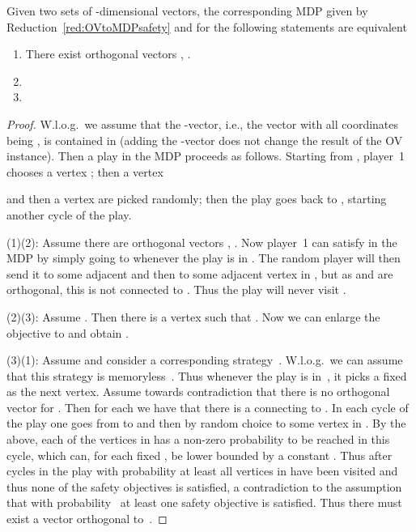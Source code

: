 \documentclass[11pt,letterpaper]{article}
\newif\iffullversion
\newcommand{\infull}[1]{\iffullversion #1\fi}
\begin{document}
\begin{lemma}\label{lem:OVtoMDPsafety}
  Given two sets  of -dimensional vectors,
  the corresponding MDP  given by Reduction~\ref{red:OVtoMDPsafety} and  
   for 
  the following statements are equivalent
  \begin{enumerate}
    \item There exist orthogonal vectors , .
    \item 
    \item 
    \infull{\item The winning set  is non-empty.
    \item The winning set  is non-empty.}
  \end{enumerate}
\end{lemma}
\begin{proof}
 W.l.o.g.\ we assume that the -vector, i.e., the vector with all coordinates being , is  contained in 
 (adding the -vector does not change the result of the OV instance).
 Then a play in the MDP  proceeds as follows. 
 Starting from , player~1 chooses a vertex ; then a vertex
 
 and then a vertex  are picked randomly; then the play goes 
 back to , starting another cycle of the play.
 
 (1)(2): Assume there are orthogonal vectors , .
    Now player~1 can satisfy  in the MDP  
    by simply going to  whenever the play is in .
    The random player will then send it to some adjacent 
    and then to some adjacent vertex in , 
    but as  and  are orthogonal, this  is not connected to . 
    Thus the play will never visit .
 
 (2)(3): Assume . Then 
    there is a vertex  such that . 
    Now we can enlarge the objective
    to  and obtain
    .
 
 (3)(1): Assume  and consider
    a corresponding strategy~. 
    W.l.o.g.\ we can assume that this strategy is memoryless~\cite{Thomas95}. 
    Thus whenever the play is in~, it picks a fixed  as the next vertex.
    Assume towards contradiction that there is no orthogonal vector   for .
    Then for each  we have that there is a  connecting  to .
    In each cycle of the play one goes from  to  and then by random choice to some vertex in .
    By the above, each of the vertices in  has a non-zero probability to be 
    reached in this cycle, which can, for each fixed ,
    be lower bounded by a constant .
    Thus after  cycles in the play with probability at least  
    all vertices in  have been visited and thus none of the safety objectives is 
    satisfied, a contradiction to the assumption that with probability~ at least one
    safety objective is satisfied.
    Thus there must exist a vector  orthogonal to~.\infull{
  
  (2)(4) \& (3)(5): 
     Notice that when removing  from  we get an acyclic MDP and 
     thus each infinite
     path has to contain  infinitely often. 
     Certainly if  is in the a.s.\ winning set, this set is non-empty. 
     Thus let us assume there is a vertex  different from  with a winning strategy .
     All (winning) paths starting in  cross  after at most  steps and thus 
      must be also winning when starting in .}
\end{proof}
\end{document}
